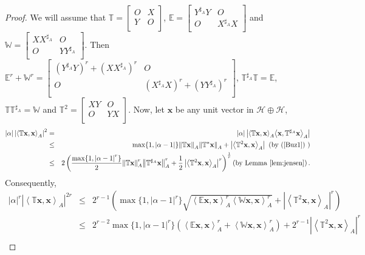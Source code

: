 \documentclass{article}
\newcommand{\bra}[1]{\left(#1\right)}
\newcommand{\seqA}[1]{{\left<#1\right>}_{A}}
\newcommand{\normA}[1]{{\left\Vert#1\right\Vert}_{A}}
\newcommand{\abs}[1]{\left\vert#1\right\vert}
\newcommand {\W}{\mathbb{W}}
\newcommand {\E}{\mathbb{E}}
\newcommand {\T}{\mathbb{T}}
\newcommand {\h}{\mathcal{H}}
\newcommand {\Ta}{\mathbb{T}^{\sharp_{A}}}
\newcommand {\Xa}{X^{\sharp_{A}}}
\newcommand {\Ya}{Y^{\sharp_{A}}}
\begin{document}
 \begin{proof} We will assume that  $\T=\begin{bmatrix} O& X\\ Y& O \\\end{bmatrix}$, $\E=\begin{bmatrix} \Ya Y& O\\ O& \Xa X \\\end{bmatrix}$ and $\W=\begin{bmatrix} X\Xa & O\\ O& Y\Ya \\\end{bmatrix}$.  Then $\E^r+\W^r=\begin{bmatrix} \bra{\Ya Y}^r+\bra{X\Xa}^r& O\\ O& \bra{\Xa X}^r+\bra{Y\Ya}^r \\\end{bmatrix}$, $\Ta \T=\E$, $\T\Ta=\W$
and $\T^2=\begin{bmatrix} XY& O\\ O& YX \\\end{bmatrix}$. Now, let $\mathbf{x}$ be any unit vector in $\h \oplus\h$,
\begin{eqnarray*}
  \abs{\alpha}\abs{\seqA{\T\mathbf{x},\mathbf{x}}}^{2}&=&\abs{\alpha}\abs{\seqA{\T\mathbf{x},\mathbf{x}}\seqA{\mathbf{x},\Ta\mathbf{x}}} \\
  &\leq&\max\{1,\abs{\alpha-1}\}\normA{\T\mathbf{x}}\normA{\T^*\mathbf{x}}+
  \abs{\seqA{\T^2\mathbf{x},\mathbf{x}}}\,\,\bra{\mbox{by (\ref{Buz1}) }} \\
   &\leq&2 \bra{\frac{\max\{1,\abs{\alpha-1}^{r}\}}{2}\normA{\T\mathbf{x}}^{r}\normA{\Ta\mathbf{x}}^{r}+
   \frac{1}{2}\abs{\seqA{\T^2\mathbf{x},\mathbf{x}}}^{r}}^{\frac{1}{r}}\bra{\mbox{by Lemma \ref{lem:jensen}}}.
   \end{eqnarray*}
  Consequently,
  \begin{eqnarray*}
  \abs{\alpha}^{r}\abs{\seqA{\T\mathbf{x},\mathbf{x}}}^{2r}&\leq& 2^{r-1}\bra{\max\{1,\abs{\alpha-1}^{r}\} \sqrt{\seqA{\E\mathbf{x},\mathbf{x}}^{r}\seqA{\W\mathbf{x},\mathbf{x}}^{r}}+
  \abs{\seqA{\T^2\mathbf{x},\mathbf{x}}}^{r}}\\
  &\leq& 2^{r-2}\max\{1,\abs{\alpha-1}^{r}\}\bra{\seqA{\E\mathbf{x},\mathbf{x}}^{r}+\seqA{\W\mathbf{x},\mathbf{x}}^{r}}+
  2^{r-1}\abs{\seqA{\T^2\mathbf{x},\mathbf{x}}}^{r}\\

\end{eqnarray*}
\end{proof}
\end{document}
